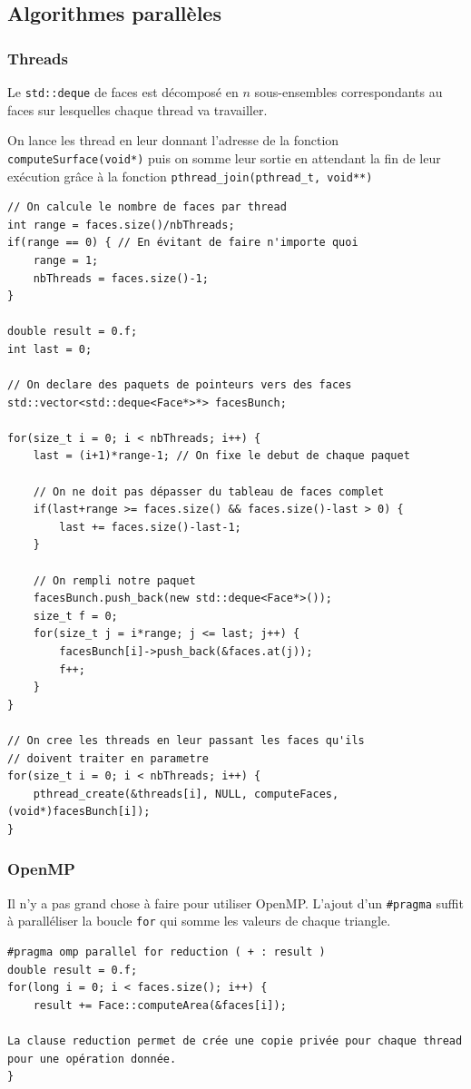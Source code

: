 \documentclass[a4paper]{article}
\begin{document}
	\subsection{Algorithmes parallèles}
		\subsubsection{Threads}
		Le \texttt{std::deque} de faces est décomposé en $n$ sous-ensembles correspondants au faces sur lesquelles chaque thread va travailler.

		On lance les thread en leur donnant l'adresse de la fonction \texttt{computeSurface(void*)} puis on somme leur sortie en attendant la fin de leur exécution grâce à la fonction \texttt{pthread\_join(pthread\_t, void**)}
		\begin{lstlisting}
// On calcule le nombre de faces par thread
int range = faces.size()/nbThreads;
if(range == 0) { // En évitant de faire n'importe quoi
	range = 1;
	nbThreads = faces.size()-1;
}

double result = 0.f;
int last = 0;

// On declare des paquets de pointeurs vers des faces
std::vector<std::deque<Face*>*> facesBunch;

for(size_t i = 0; i < nbThreads; i++) {
    last = (i+1)*range-1; // On fixe le debut de chaque paquet

	// On ne doit pas dépasser du tableau de faces complet
    if(last+range >= faces.size() && faces.size()-last > 0) {
        last += faces.size()-last-1;
    }

	// On rempli notre paquet
    facesBunch.push_back(new std::deque<Face*>());
    size_t f = 0;
    for(size_t j = i*range; j <= last; j++) {
        facesBunch[i]->push_back(&faces.at(j));
        f++;
    }
}

// On cree les threads en leur passant les faces qu'ils
// doivent traiter en parametre
for(size_t i = 0; i < nbThreads; i++) {
    pthread_create(&threads[i], NULL, computeFaces, (void*)facesBunch[i]);
}
		\end{lstlisting}

		\subsubsection{OpenMP}
		Il n'y a pas grand chose à faire pour utiliser OpenMP. L'ajout d'un \texttt{\#pragma} suffit à paralléliser la boucle \texttt{for} qui somme les valeurs de chaque triangle.
		\begin{lstlisting}
#pragma omp parallel for reduction ( + : result )
double result = 0.f;
for(long i = 0; i < faces.size(); i++) {
    result += Face::computeArea(&faces[i]);

La clause reduction permet de crée une copie privée pour chaque thread pour une opération donnée.
}
		\end{lstlisting}
\newpage
\end{document}
